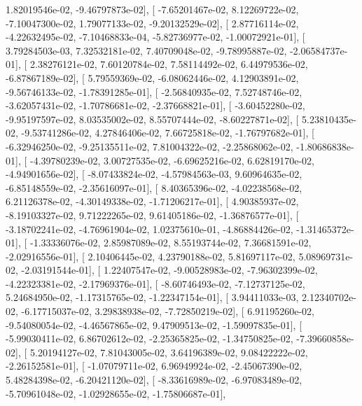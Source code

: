 \documentclass{article}
\begin{document}
          1.82019546e-02,  -9.46797873e-02],
       [ -7.65201467e-02,   8.12269722e-02,  -7.10047300e-02,
          1.79077133e-02,  -9.20132529e-02],
       [  2.87716114e-02,  -4.22632495e-02,  -7.10468833e-04,
         -5.82736977e-02,  -1.00072921e-01],
       [  3.79284503e-03,   7.32532181e-02,   7.40709048e-02,
         -9.78995887e-02,  -2.06584737e-01],
       [  2.38276121e-02,   7.60120784e-02,   7.58114492e-02,
          6.44979536e-02,  -6.87867189e-02],
       [  5.79559369e-02,  -6.08062446e-02,   4.12903891e-02,
         -9.56746133e-02,  -1.78391285e-01],
       [ -2.56840935e-02,   7.52748746e-02,  -3.62057431e-02,
         -1.70786681e-02,  -2.37668821e-01],
       [ -3.60452280e-02,  -9.95197597e-02,   8.03535002e-02,
          8.55707444e-02,  -8.60227871e-02],
       [  5.23810435e-02,  -9.53741286e-02,   4.27846406e-02,
          7.66725818e-02,  -1.76797682e-01],
       [ -6.32946250e-02,  -9.25135511e-02,   7.81004322e-02,
         -2.25868062e-02,  -1.80686838e-01],
       [ -4.39780239e-02,   3.00727535e-02,  -6.69625216e-02,
          6.62819170e-02,  -4.94901656e-02],
       [ -8.07433824e-02,  -4.57984563e-03,   9.60964635e-02,
         -6.85148559e-02,  -2.35616097e-01],
       [  8.40365396e-02,  -4.02238568e-02,   6.21126378e-02,
         -4.30149338e-02,  -1.71206217e-01],
       [  4.90385937e-02,  -8.19103327e-02,   9.71222265e-02,
          9.61405186e-02,  -1.36876577e-01],
       [ -3.18702241e-02,  -4.76961904e-02,   1.02375610e-01,
         -4.86884426e-02,  -1.31465372e-01],
       [ -1.33336076e-02,   2.85987089e-02,   8.55193744e-02,
          7.36681591e-02,  -2.02916556e-01],
       [  2.10406445e-02,   4.23790188e-02,   5.81697117e-02,
          5.08969731e-02,  -2.03191544e-01],
       [  1.22407547e-02,  -9.00528983e-02,  -7.96302399e-02,
         -4.22323381e-02,  -2.17969376e-01],
       [ -8.60746493e-02,  -7.12737125e-02,   5.24684950e-02,
         -1.17315765e-02,  -1.22347154e-01],
       [  3.94411033e-03,   2.12340702e-02,  -6.17715037e-02,
          3.29838938e-02,  -7.72850219e-02],
       [  6.91195260e-02,  -9.54080054e-02,  -4.46567865e-02,
          9.47909513e-02,  -1.59097835e-01],
       [ -5.99030411e-02,   6.86702612e-02,  -2.25365825e-02,
         -1.34750825e-02,  -7.39660858e-02],
       [  5.20194127e-02,   7.81043005e-02,   3.64196389e-02,
          9.08422222e-02,  -2.26152581e-01],
       [ -1.07079711e-02,   6.96949924e-02,  -2.45067390e-02,
          5.48284398e-02,  -6.20421120e-02],
       [ -8.33616989e-02,  -6.97083489e-02,  -5.70961048e-02,
         -1.02928655e-02,  -1.75806687e-01],
\end{document}
